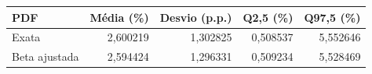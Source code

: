 \begin{tabular}{lrrrr}
\toprule
PDF & Média (\%) & Desvio (p.p.) & Q2,5 (\%) & Q97,5 (\%) \\
\midrule
Exata & 2,600219 & 1,302825 & 0,508537 & 5,552646 \\
Beta ajustada & 2,594424 & 1,296331 & 0,509234 & 5,528469 \\
\bottomrule
\end{tabular}
